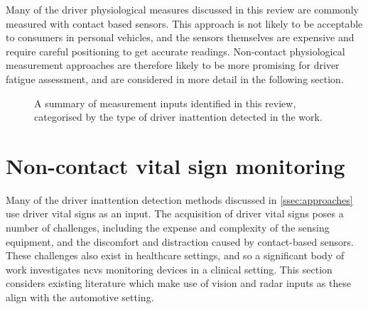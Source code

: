 \documentclass[11pt, parskip=half*,twoside=false]{scrbook}
\begin{document}
Many of the driver physiological measures discussed in this review are commonly measured with contact based sensors. This approach is not likely to be acceptable to consumers in personal vehicles, and the sensors themselves are expensive and require careful positioning to get accurate readings. Non-contact physiological measurement approaches are therefore likely to be more promising for driver fatigue assessment, and are considered in more detail in the following section.

\begin{landscape}	
	\begin{figure}[b]
		\centering
		
		\caption{A summary of measurement inputs identified in this review, categorised by the type of driver inattention detected in the work.}
		\label{fig:summary}
	\end{figure}
\end{landscape}	


\section{Non-contact vital sign monitoring} \label{sec:vital_sign}
Many of the driver inattention detection methods discussed in \cref{ssec:approaches} use driver vital signs as an input. The acquisition of driver vital signs poses a number of challenges, including the expense and complexity of the sensing equipment, and the discomfort and distraction caused by contact-based sensors. These challenges also exist in healthcare settings, and so a significant body of work investigates \gls{ncvs} monitoring devices in a clinical setting. This section considers existing literature which make use of vision and radar inputs as these align with the automotive setting.
\end{document}
